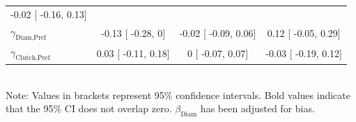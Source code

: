 \documentclass[11pt,]{article}
\begin{document}
\begin{table}[h]
\begin{tabular}{lccc}
-0.02 [
-0.16,
0.13] \\

$\gamma_{\text{Diam,Pref}}$ & 
-0.13 [
-0.28,
0] & 

-0.02 [
-0.09,
0.06] & 

0.12 [
-0.05,
0.29] \\

$\gamma_{\text{Clutch,Pref}}$ & 
0.03 [
-0.11,
0.18] & 

0 [
-0.07,
0.07] & 

-0.03 [
-0.19,
0.12] \\ 
\hline
\end{tabular}
\bigskip{}
\\
{\footnotesize Note: Values in brackets represent 95\% confidence intervals. Bold values indicate that the 95\% CI does not overlap zero. $\beta_{\text{Diam}}$ has been adjusted for bias.}
\end{table}

\newpage 
\end{document}
